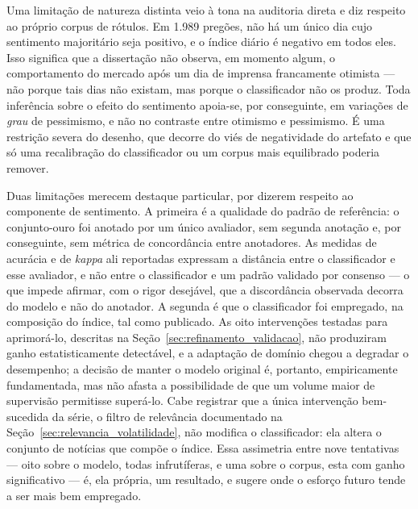 Uma limitação de natureza distinta veio à tona na auditoria direta e diz respeito ao próprio corpus de rótulos. Em 1.989 pregões, não há um único dia cujo sentimento majoritário seja positivo, e o índice diário é negativo em todos eles. Isso significa que a dissertação não observa, em momento algum, o comportamento do mercado após um dia de imprensa francamente otimista --- não porque tais dias não existam, mas porque o classificador não os produz. Toda inferência sobre o efeito do sentimento apoia-se, por conseguinte, em variações de \emph{grau} de pessimismo, e não no contraste entre otimismo e pessimismo. É uma restrição severa do desenho, que decorre do viés de negatividade do artefato e que só uma recalibração do classificador ou um corpus mais equilibrado poderia remover.

Duas limitações merecem destaque particular, por dizerem respeito ao componente de sentimento. A primeira é a qualidade do padrão de referência: o conjunto-ouro foi anotado por um único avaliador, sem segunda anotação e, por conseguinte, sem métrica de concordância entre anotadores. As medidas de acurácia e de \textit{kappa} ali reportadas expressam a distância entre o classificador e esse avaliador, e não entre o classificador e um padrão validado por consenso --- o que impede afirmar, com o rigor desejável, que a discordância observada decorra do modelo e não do anotador. A segunda é que o classificador foi empregado, na composição do índice, tal como publicado. As oito intervenções testadas para aprimorá-lo, descritas na Seção~\ref{sec:refinamento_validacao}, não produziram ganho estatisticamente detectável, e a adaptação de domínio chegou a degradar o desempenho; a decisão de manter o modelo original é, portanto, empiricamente fundamentada, mas não afasta a possibilidade de que um volume maior de supervisão permitisse superá-lo. Cabe registrar que a única intervenção bem-sucedida da série, o filtro de relevância documentado na Seção~\ref{sec:relevancia_volatilidade}, não modifica o classificador: ela altera o conjunto de notícias que compõe o índice. Essa assimetria entre nove tentativas --- oito sobre o modelo, todas infrutíferas, e uma sobre o corpus, esta com ganho significativo --- é, ela própria, um resultado, e sugere onde o esforço futuro tende a ser mais bem empregado.

